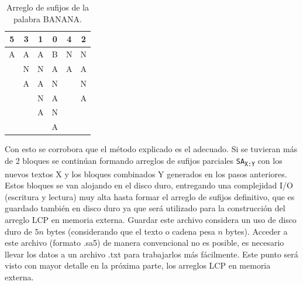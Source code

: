 \begin{table}[!hbt]
\centering
\begin{tabular}{cccccc}
\hline
\multicolumn{1}{|c|}{5} & \multicolumn{1}{c|}{3} & \multicolumn{1}{c|}{1} & \multicolumn{1}{c|}{0} & \multicolumn{1}{c|}{4} & \multicolumn{1}{c|}{2} \\ \hline
A                       & A                      & A                      & B                      & N                      & N                      \\
                        & N                      & N                      & A                      & A                      & A                      \\
                        & A                      & A                      & N                      &                        & N                      \\
                        &                        & N                      & A                      &                        & A                      \\
                        &                        & A                      & N                      &                        &                        \\
                        &                        &                        & A                      &                        &                       
\end{tabular}
\caption{Arreglo de sufijos de la palabra BANANA.}
\end{table}

Con esto se corrobora que el método explicado es el adecuado. Si se tuvieran más de 2 bloques se continúan formando arreglos de sufijos parciales \texttt{SA\textsubscript{X:Y}} con los nuevos textos X y los bloques combinados Y generados en los pasos anteriores. Estos bloques se van alojando en el disco duro, entregando una complejidad I/O (escritura y lectura) muy alta hasta formar el arreglo de sufijos definitivo, que es guardado también en disco duro ya que será utilizado para la construcción del arreglo LCP en memoria externa. Guardar este archivo considera un uso de disco duro de $5n$ bytes (considerando que el texto o cadena pesa $n$ bytes). Acceder a este archivo (formato .sa5) de manera convencional no es posible, es necesario llevar los datos a un archivo .txt para trabajarlos más fácilmente. Este punto será visto con mayor detalle en la próxima parte, los arreglos LCP en memoria externa. 

